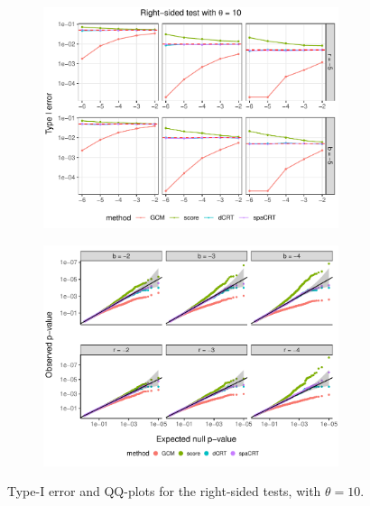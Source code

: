 \documentclass[12pt]{article}
\theoremstyle{definition}
\begin{document}
\begin{figure}
  \centering
  \begin{subfigure}{\textwidth}
    \centering
    \includegraphics[width=0.95\textwidth]{figures-and-tables/simulation/Type-I-error/plot-bin-NB-normal-B-50000-n-5000-5e3-n5-n5-disp-10-Type-I-error-RIGHT.pdf}
  \end{subfigure}

  \begin{subfigure}{\textwidth}
    \centering
    \includegraphics[width=0.95\textwidth]{figures-and-tables/simulation/QQ/plot-bin-NB-normal-B-50000-n-5000-5e3-n5-n5-disp-10-QQ-RIGHT.pdf}
  \end{subfigure}
  \caption{Type-I error and QQ-plots for the right-sided tests, with $\theta = 10$.}
  \label{fig:simulation-Type-I-error-RIGHT-10}
\end{figure}
\end{document}
